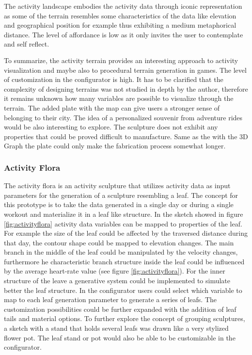 \documentclass[../medieninformatik-arbeit.tex]{subfiles}
\begin{document}
The activity landscape embodies the activity data through iconic representation as some of the terrain resembles some characteristics of the data like elevation and geographical position for example thus exhibiting a medium metaphorical distance. The level of affordance is low as it only invites the user to contemplate and self reflect. 

To summarize, the activity terrain provides an interesting approach to activity visualization and maybe also to procedural terrain generation in games. The level of customization in the configurator is high. It has to be clarified that the complexity of designing terrains was not studied in depth by the author, therefore it remains unknown how many variables are possible to visualize through the terrain. The added plate with the map can give users a stronger sense of belonging to their city. The idea of a personalized souvenir from adventure rides would be also interesting to explore. The sculpture does not exhibit any properties that could be proved difficult to manufacture. Same as the with the 3D Graph the plate could only make the fabrication process somewhat longer.  

\subsubsection{Activity Flora}
The activity flora is an activity sculpture that utilizes activity data as input parameters for the generation of a sculpture resembling a leaf. The concept for this prototype is to take the data generated in a single day or during a single workout and materialize it in a leaf like structure. In the sketch showed in figure \ref{fig:activityflora} activity data variables can be mapped to properties of the leaf. For example the size of the leaf could be affected by the traversed distance during that day, the contour shape could be mapped to elevation changes. The main branch in the middle of the leaf could be manipulated by the velocity changes, furthermore he characteristic branch structure inside the leaf could be influenced by the average heart-rate value (see figure \ref{fig:activityflora}). For the inner structure of the leave a generative system could be implemented to simulate better the leaf structure. In the configurator users could select which variable to map to each leaf generation parameter to generate a series of leafs. The customization possibilities could be further expanded with the addition of leaf tails and material options. To further explore the concept of grouping sculptures, a sketch with a stand that holds several leafs was drawn like a very stylized  flower pot. The leaf stand or pot would also be able to be customizable in the configurator.  
\end{document}
